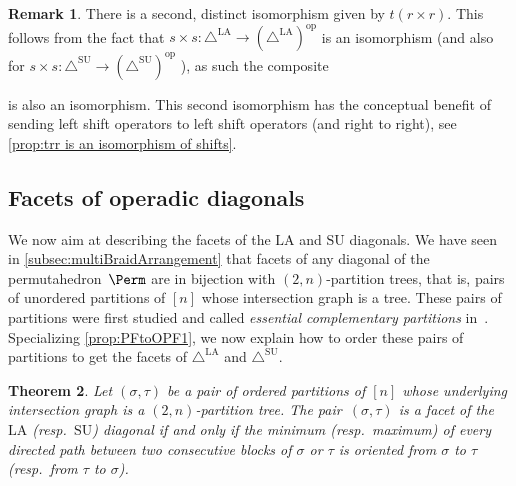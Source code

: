 \documentclass{amsart}
\newcommand{\darkblue}{\color{darkblue}} %
\newtheorem{theorem}{Theorem}[section]
\theoremstyle{definition}
\newtheorem{remark}[theorem]{Remark}
\newcommand{\resp}{resp.~} %
\newcommand{\defn}[1]{\textsl{\darkblue #1}} %
\newcommand{\SU}{\mathrm{SU}}
\newcommand{\LA}{\mathrm{LA}}
\newcommand{\SUD}{\triangle^{\mathrm{SU}}}
\newcommand{\LAD}{\triangle^{\mathrm{LA}}}
\newcommand{\op}{\mathrm{op}}
\begin{document}
\begin{remark} \label{rem:Alternate Isomorphism}
There is a second, distinct isomorphism given by $t(r\times r)$.
This follows from the fact that $s\times s:\LAD \to (\LAD)^{\op}$ is an isomorphism (and also for  $s\times s:\SUD \to (\SUD)^{\op}$ ), as such the composite 
\begin{center}
\end{center}
is also an isomorphism.
This second isomorphism has the conceptual benefit of sending left shift operators to left shift operators (and right to right), see \cref{prop:trr is an isomorphism of shifts}.
\end{remark}


\subsection{Facets of operadic diagonals}
\label{subsec:facets-operadic-diags}

We now aim at describing the facets of the $\LA$ and $\SU$ diagonals. 
We have seen in \cref{subsec:multiBraidArrangement} that facets of any diagonal of the permutahedron~$\Perm$ are in bijection with $(2,n)$-partition trees, that is, pairs of unordered partitions of $[n]$ whose intersection graph is a tree.
These pairs of partitions were first studied and called \defn{essential complementary partitions} in~\cite{Chen, ChenGoyal, KajitaniUenoChen}.
Specializing \cref{prop:PFtoOPF1}, we now explain how to order these pairs of partitions to get the facets of $\LAD$ and $\SUD$. 

\begin{theorem}
\label{thm:facet-ordering}
Let $(\sigma,\tau)$ be a pair of ordered partitions of $[n]$ whose underlying intersection graph is a $(2,n)$-partition tree.
The pair~$(\sigma,\tau)$ is a facet of the $\LA$ (\resp $\SU$) diagonal if and only if the minimum (\resp maximum) of every directed path between two consecutive blocks of $\sigma$ or $\tau$ is oriented from $\sigma$ to $\tau$ (\resp from $\tau$ to $\sigma$).
\end{theorem}
\end{document}
